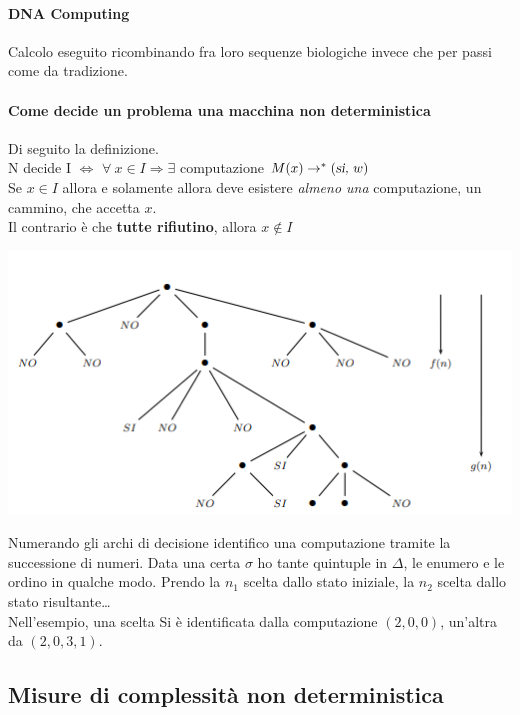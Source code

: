 \documentclass[10pt]{book}
\begin{document}
\paragraph{DNA Computing} Calcolo eseguito ricombinando fra loro sequenze biologiche invece che per passi come da tradizione.
\paragraph{Come decide un problema una macchina non deterministica} Di seguito la definizione.\\
N decide I $\Leftrightarrow$ $\forall\: x \in I \Rightarrow \exists$ computazione $M(x) \rightarrow^* (\textsl{si, }w)$\\
Se $x \in I$ allora e solamente allora deve esistere \textit{almeno una} computazione, un cammino, che accetta $x$.\\
Il contrario è che \textbf{tutte rifiutino}, allora $x \not\in I$\\
\begin{center}
	\includegraphics[scale=1]{grafo_nondet.png}
\end{center}
Numerando gli archi di decisione identifico una computazione tramite la successione di numeri. Data una certa $\sigma$ ho tante quintuple in $\Delta$, le enumero e le ordino in qualche modo. Prendo la $n_1$ scelta dallo stato iniziale, la $n_2$ scelta dallo stato risultante\ldots\\
Nell'esempio, una scelta Si è identificata dalla computazione $(2, 0, 0)$, un'altra da $(2, 0, 3, 1)$.
\subsection{Misure di complessità non deterministica}
\end{document}
